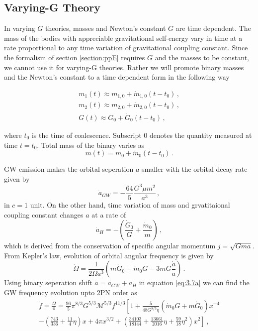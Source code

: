 \documentclass[11pt]{article}
\begin{document}
 \subsection{Varying-G Theory}\label{gdot}

 \hspace*{15.5pt} In varying $G$ theories, masses and Newton's constant $G$ are time dependent. The mass of the bodies with appreciable gravitational self-energy vary in time at a rate proportional to any time variation of gravitational coupling constant\cite{PhysRevLett.65.953}. Since the formalism of section \ref{section:ppE} requires $G$ and the masses to be constant, we cannot use it for varying-G theories. Rather we will promote binary masses and the Newton's constant to a time dependent form in the following way
 
 \begin{eqnarray}\label{eq:3.7a2}
 m_1(t)\approx m_{1,0}+\dot{m}_{1,0}(t-t_0)\,, \\
 \label{eq:3.7a3}  m_2(t)\approx m_{2,0}+\dot{m}_{2,0}(t-t_0)\,, \\
   \label{eq:3.7a4}  G(t)\approx  G_0+\dot{G}_0(t-t_0)\, , 
 \end{eqnarray}
 
 where $t_0$ is the time of coalescence. Subscript $0$ denotes the quantity measured at time $t=t_0$. Total mass of the binary varies as
 \begin{equation}
 m(t)=m_0+\dot{m}_0(t-t_0)\,.
 \end{equation}
 
 \hspace*{15.5pt}GW emission makes the orbital seperation $a$ smaller with the orbital decay rate given by \cite{PhysRevD.49.2658}
 \begin{equation}
 \dot{a}_{GW}=-\frac{64}{5}\frac{G^3 \mu m^2}{a^3}\,,
 \end{equation}
 in $c=1$ unit. On the other hand, time variation of mass and grvatitaional coupling constant changes $a$ at a rate of 
 \begin{equation}
 \dot{a}_H=-\left(\frac{\dot{G}_0}{G}+\frac{\dot{m}_0}{m}\right)\,,
 \end{equation}
 which is derived from the conservation of specific angular momentum $j=\sqrt{Gma}$. From Kepler's law, evolution of orbital angular frequency is given by
 \begin{equation}\label{eq:3.7a}
 \dot{\Omega}=\frac{1}{2\Omega a^3}\left(m\dot{G}_0+\dot{m}_0G-3mG\frac{\dot{a}}{a}\right)\,.
 \end{equation}
 \hspace*{15.5pt} Using binary seperation shift $\dot{a}=\dot{a}_{GW}+\dot{a}_H$ in equation \eqref{eq:3.7a} we can find the GW frequency evolution upto 2PN order as
\begin{align} \label{eq:3.7b}
 \dot{f}=\frac{\dot{\Omega}}{\pi}=\frac{96}{5}\pi^{8/3}G^{5/3}\mathcal{M}^{5/3}f^{11/3}\left[1+\frac{5}{48 G^{8/3}\eta}(\dot{m}_0G+m\dot{G}_0)x^{-4} \right. \nonumber\\ \left.  -\left(\frac{743}{336}+\frac{11}{4}\eta\right)x+4\pi x^{3/2}+\left(\frac{34103}{18144}+\frac{13661}{2016}\eta+\frac{59}{18}\eta^2\right)x^2 \right]\,,
 \end{align}
 
\end{document}
